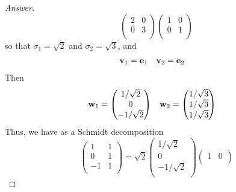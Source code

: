 \documentclass[../psets.tex]{subfiles}
\begin{document}
\begin{enumerate}[label={\textbf{3.\arabic*.}}]
\begin{proof}[Answer]
\begin{equation*}
\begin{pmatrix}
                2 & 0\\
                0 & 3\\
            \end{pmatrix}
            \begin{pmatrix}
                1 & 0\\
                0 & 1\\
            \end{pmatrix}
        \end{equation*}
        so that $\sigma_1=\sqrt{2}$ and $\sigma_2=\sqrt{3}$, and
        \begin{align*}
            \mathbf{v}_1 &= \mathbf{e}_1&
            \mathbf{v}_2 &= \mathbf{e}_2
        \end{align*}
        Then
        \begin{align*}
            \mathbf{w}_1 &=
            \begin{pmatrix}
                1/\sqrt{2}\\
                0\\
                -1/\sqrt{2}\\
            \end{pmatrix}&
            \mathbf{w}_2 &=
            \begin{pmatrix}
                1/\sqrt{3}\\
                1/\sqrt{3}\\
                1/\sqrt{3}\\
            \end{pmatrix}
        \end{align*}
        Thus, we have as a Schmidt decomposition
        \begin{equation*}
            \begin{pmatrix}
                1 & 1\\
                0 & 1\\
                -1 & 1\\
            \end{pmatrix}
            = \sqrt{2}
            \begin{pmatrix}
                1/\sqrt{2}\\
                0\\
                -1/\sqrt{2}\\
            \end{pmatrix}
            \begin{pmatrix}
                1 & 0\\
            \end{pmatrix}

\end{equation*}
\end{proof}
\end{enumerate}
\end{document}

